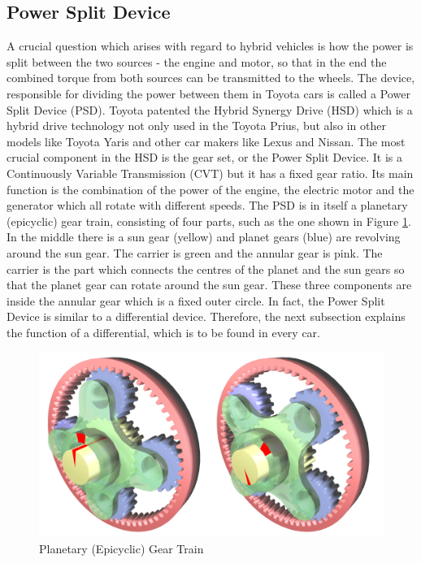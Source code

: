 \subsection{Power Split Device}
A crucial question which arises with regard to hybrid vehicles is how the power is split between the two sources - the engine and motor, so that in the end the combined torque from both sources can be transmitted to the wheels. The device, responsible for dividing the power between them in Toyota cars is called a Power Split Device (PSD). Toyota patented the Hybrid Synergy Drive (HSD) which is a hybrid drive technology not only used in the Toyota Prius, but also in other models like Toyota Yaris and other car makers like Lexus and Nissan. The most crucial component in the HSD is the gear set, or the Power Split Device. It is a Continuously Variable Transmission (CVT) but it has a fixed gear ratio. Its main function is the combination of the power of the engine, the electric motor and the generator which all rotate with different speeds. The PSD is in itself a planetary (epicyclic) gear train, consisting of four parts, such as the one shown in Figure \ref{fig:planGear}. In the middle there is a sun gear (yellow) and planet gears (blue) are revolving around the sun gear. The carrier is green and the annular gear is pink. The carrier is the part which connects the centres of the planet and the sun gears so that the planet gear can rotate around the sun gear. These three components are inside the annular gear which is a fixed outer circle. In fact, the Power Split Device is similar to a differential device. Therefore, the next subsection explains the function of a differential, which is to be found in every car.

\begin{figure}[h]
\centering
\includegraphics[scale=0.11]{figures/planetaryGear.png}
\caption{Planetary (Epicyclic) Gear Train \citep{planetaryGear}}
\label{fig:planGear}
\end{figure}

